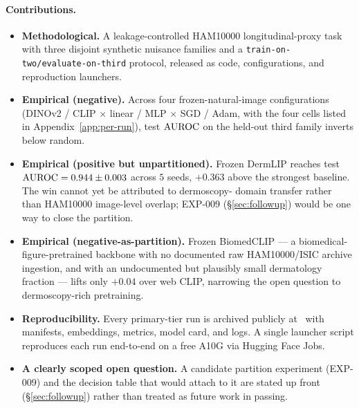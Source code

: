 \paragraph{Contributions.}
\begin{itemize}
\item \textbf{Methodological.} A leakage-controlled HAM10000 longitudinal-proxy
      task with three disjoint synthetic nuisance families and a
      \texttt{train-on-two/evaluate-on-third} protocol, released as code,
      configurations, and reproduction launchers.
\item \textbf{Empirical (negative).} Across four frozen-natural-image
      configurations (DINOv2 / CLIP $\times$ linear / MLP $\times$ SGD
      / Adam, with the four cells listed in
      Appendix~\ref{app:per-run}), test $\mathrm{AUROC}$ on the held-out third
      family inverts below random.
\item \textbf{Empirical (positive but unpartitioned).} Frozen DermLIP reaches
      test $\mathrm{AUROC} = 0.944 \pm 0.003$ across $5$ seeds, $+0.363$ above the
      strongest baseline. The win cannot yet be attributed to dermoscopy-
      domain transfer rather than HAM10000 image-level overlap;
      EXP-009 (\S\ref{sec:followup}) would be one way to close the
      partition.
\item \textbf{Empirical (negative-as-partition).} Frozen BiomedCLIP ---
      a biomedical-figure-pretrained backbone with no documented raw
      HAM10000/ISIC archive ingestion, and with an undocumented but
      plausibly small dermatology fraction --- lifts only $+0.04$ over
      web CLIP, narrowing the open question to dermoscopy-rich
      pretraining.
\item \textbf{Reproducibility.} Every primary-tier run is archived publicly at
      \runarchive\ with manifests, embeddings, metrics, model card, and logs.
      A single launcher script reproduces each run end-to-end on a free A10G
      via Hugging Face Jobs.
\item \textbf{A clearly scoped open question.} A candidate partition
      experiment (EXP-009) and the decision table that would attach to
      it are stated up front (\S\ref{sec:followup}) rather than treated
      as future work in passing.
\end{itemize}
